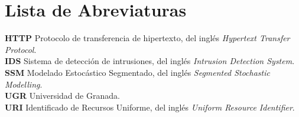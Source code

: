 \chapter*{Lista de Abreviaturas}
\label{abreviaturas}

\textbf{HTTP} Protocolo de transferencia de hipertexto, del inglés \textit{Hypertext Transfer Protocol}.\\

\textbf{IDS} Sistema de detección de intrusiones, del inglés \textit{Intrusion Detection System}.\\

\textbf{SSM} Modelado Estocástico Segmentado, del inglés \textit{Segmented Stochastic Modelling}.\\

\textbf{UGR} Universidad de Granada.\\

\textbf{URI} Identificado de Recursos Uniforme, del inglés \textit{Uniform Resource Identifier}.